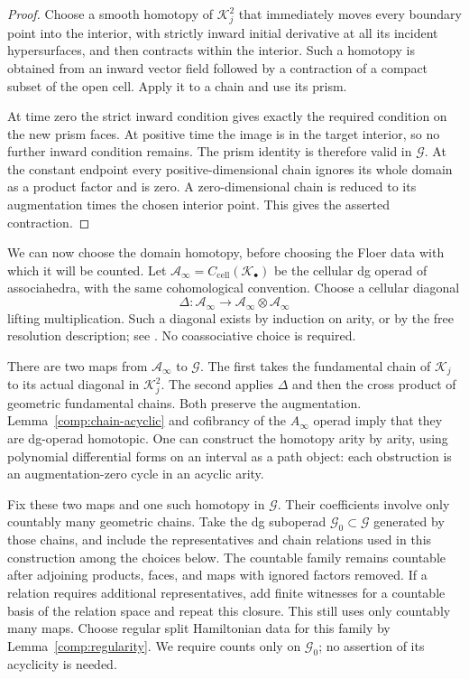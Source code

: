 \begin{proof}
Choose a smooth homotopy of $\mathcal K_j^2$ that immediately moves every
boundary point into the interior, with strictly inward initial
derivative at all its incident hypersurfaces, and then contracts
within the interior.  Such a homotopy is obtained from an inward
vector field followed by a contraction of a compact subset of the
open cell.  Apply it to a chain and use its prism.

At time zero the strict inward condition gives exactly the
required condition on the new prism faces.  At positive time the
image is in the target interior, so no further inward condition
remains.  The prism identity is therefore valid in $\mathcal G$.
At the constant endpoint every positive-dimensional chain ignores
its whole domain as a product factor and is zero.  A
zero-dimensional chain is reduced to its augmentation times the
chosen interior point.  This gives the asserted contraction.
\end{proof}

We can now choose the domain homotopy, before choosing the Floer
data with which it will be counted.  Let
$\mathcal A_\infty=C_{\mathrm{cell}}(\mathcal K_\bullet)$ be the cellular
dg operad of associahedra, with the same cohomological convention.
Choose a cellular diagonal
\begin{equation}
 \Delta:\mathcal A_\infty\longrightarrow
             \mathcal A_\infty\otimes\mathcal A_\infty
 \label{comp:cellular-diagonal}
\end{equation}
lifting multiplication.  Such a diagonal exists by induction on
arity, or by the free resolution description; see
\cite{MarklShnider}.  No coassociative choice is required.

There are two maps from $\mathcal A_\infty$ to $\mathcal G$.
The first takes the fundamental chain of $\mathcal K_j$ to its actual
diagonal in $\mathcal K_j^2$.  The second applies $\Delta$ and then the
cross product of geometric fundamental chains.  Both preserve
the augmentation.  Lemma~\ref{comp:chain-acyclic} and cofibrancy
of the $A_\infty$ operad imply that they are dg-operad homotopic.
One can construct the homotopy arity by arity, using polynomial
differential forms on an interval as a path object: each
obstruction is an augmentation-zero cycle in an acyclic arity.

Fix these two maps and one such homotopy in $\mathcal G$.
Their coefficients involve only countably many geometric chains.
Take the dg suboperad $\mathcal G_0\subset\mathcal G$ generated
by those chains, and include the representatives and chain
relations used in this construction among the choices below.
The countable family remains countable after adjoining products,
faces, and maps with ignored factors removed.  If a relation requires
additional representatives, add finite witnesses for a countable
basis of the relation space and repeat this closure.  This still
uses only countably many maps.  Choose regular
split Hamiltonian data for this family by
Lemma~\ref{comp:regularity}.  We require counts only on
$\mathcal G_0$; no assertion of its acyclicity is needed.


